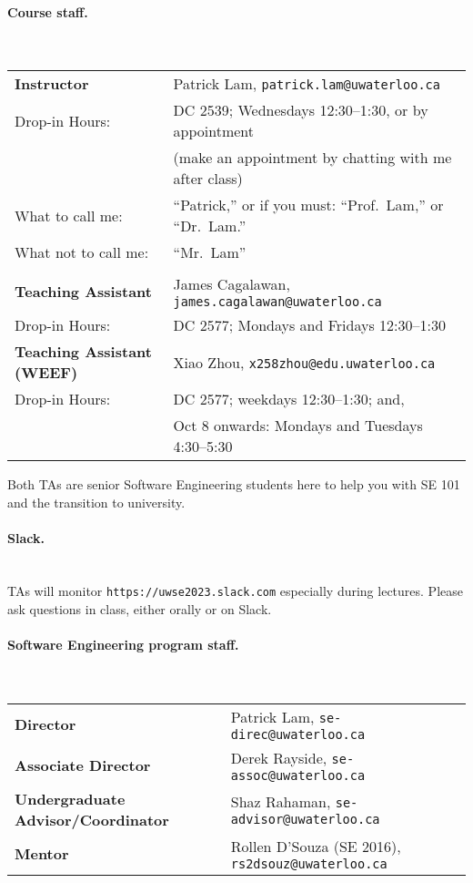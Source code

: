 \documentclass[11pt,onecolumn]{article}
\begin{document}
\paragraph{Course staff.}~\\[1em]
\begin{tabular}{ll}
{\bf Instructor} & Patrick Lam, {\tt patrick.lam@uwaterloo.ca}\\
Drop-in Hours:& DC 2539; Wednesdays 12:30--1:30, or by appointment \\
& (make an appointment by chatting with me after class) \\

What to call me:& ``Patrick,'' or if you must: ``Prof.~Lam,'' or ``Dr.~Lam.''\\
What not to call me:& ``Mr.~Lam'' \\ \\

{\bf Teaching Assistant} &
James Cagalawan, {\tt james.cagalawan@uwaterloo.ca}\\
Drop-in Hours: & DC 2577; Mondays and Fridays 12:30--1:30 \\
{\bf Teaching Assistant (WEEF)} &
Xiao Zhou, {\tt x258zhou@edu.uwaterloo.ca}\\
Drop-in Hours: & DC 2577; weekdays 12:30--1:30; and, \\
& Oct 8 onwards: Mondays and Tuesdays 4:30--5:30
\end{tabular}

\noindent Both TAs are senior Software Engineering students here to help you with SE 101
and the transition to university.

\paragraph{Slack.}~\\[1em]
TAs will monitor {\tt https://uwse2023.slack.com} especially during lectures.
Please ask questions in class, either orally or on Slack.

\paragraph{Software Engineering program staff.}~\\[1em]
\begin{tabular}{ll}
  {\bf Director} & Patrick Lam, {\tt se-direc@uwaterloo.ca} \\
  {\bf Associate Director} & Derek Rayside, {\tt se-assoc@uwaterloo.ca} \\
  {\bf Undergraduate Advisor/Coordinator} & Shaz Rahaman, {\tt se-advisor@uwaterloo.ca} \\
  {\bf Mentor} & Rollen D'Souza (SE 2016), {\tt rs2dsouz@uwaterloo.ca}
\end{tabular}
\end{document}

